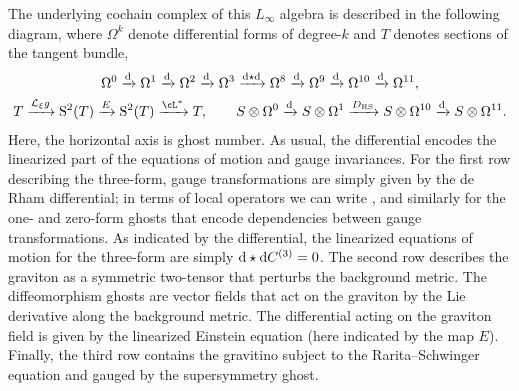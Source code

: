 \documentclass[10pt,a4paper]{amsart}
\numberwithin{equation}{section}
\theoremstyle{definition}
\def\d{{\rm d}}
\begin{document}
The underlying cochain complex of this $L_\infty$ algebra is described in the following diagram, where $\Omega^{k}$ denote differential forms of degree-$k$ and $T$ denotes sections of the tangent bundle,
\begin{gather}
\Omega^{0} \xrightarrow{\d}
\Omega^{1} \xrightarrow{\d}
\Omega^{2} \xrightarrow{\d}
\Omega^{3} \xrightarrow{\d \star \d}
\Omega^{8} \xrightarrow{\d}
\Omega^{9} \xrightarrow{\d}
\Omega^{10} \xrightarrow{\d}
\Omega^{11},\nonumber
\\
T \xrightarrow{\mathcal{L}_\xi g}
\mathrm{S}^2(T) \xrightarrow{E}
\mathrm{S}^2(T) \xrightarrow{\cL^*}
T,\qquad
S \otimes \Omega^0 \xrightarrow{\d}
S \otimes \Omega^1 \xrightarrow{D_{\rm RS}}
S \otimes \Omega^{10} \xrightarrow{\d}
S \otimes \Omega^{11}.\label{eq: sugrafields}
\end{gather}
Here, the horizontal axis is ghost number.
As usual, the differential encodes the linearized part of the equations of motion and gauge invariances. For the first row describing the three-form, gauge transformations are simply given by the de Rham differential; in terms of local operators we can write
\smash{$
 \delta C^{(3)} = \d C^{(2)}$},
and similarly for the one- and zero-form ghosts that encode dependencies between gauge transformations. As indicated by the differential, the linearized equations of motion for the three-form are simply $\d \star \d C^{(3)}=0$.
The second row describes the graviton as a symmetric two-tensor that perturbs the background metric. The diffeomorphism ghosts are vector fields that act on the graviton by the Lie derivative along the background metric. The differential acting on the graviton field is given by the linearized Einstein equation (here indicated by the map $E$).
Finally, the third row contains the gravitino subject to the Rarita--Schwinger equation and gauged by the supersymmetry ghost.
\end{document}
